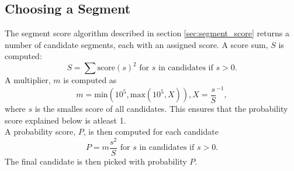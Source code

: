 \subsection{Choosing a Segment}
%
The segment score algorithm described in section \ref{sec:segment_score} returns a number of candidate segments, each with an assigned score. A score sum, $S$ is computed:
\[
S = \sum{\text{score}(s)^2 \text{ for } s \text{ in candidates if } s > 0}.
\]
%
%
A multiplier, $m$ is computed as
\[
m = \text{min}(10^5, \text{max}(10^5, X)), X = \frac{s}{S}^{-1},
\] %
%
%
where $s$ is the smalles score of all candidates. This ensures that the probability score explained below is atleast 1.\\
A probability score, $P$, is then computed for each candidate 
\[
P = m \frac{s^2}{S} \text{ for } s \text{ in candidates if } s > 0.
\] %
%
The final candidate is then picked with probability $P$.
%
%
%
%
%
